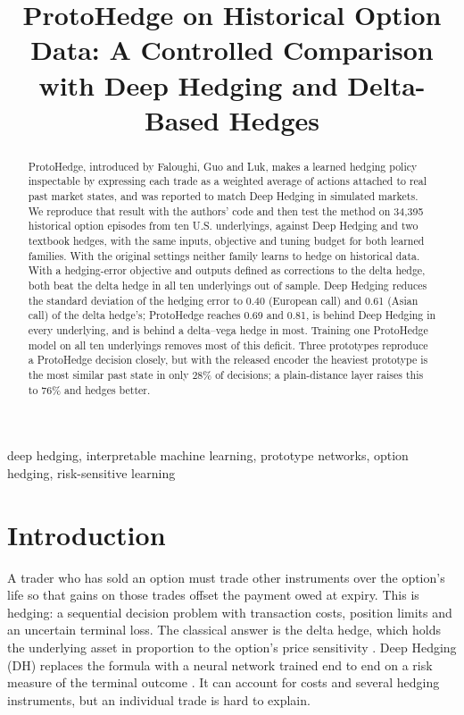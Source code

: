 \documentclass[10pt,conference]{IEEEtran}
\newcommand{\DeepH}{Deep Hedging}
\begin{document}
\title{ProtoHedge on Historical Option Data: A Controlled Comparison with Deep Hedging and Delta-Based Hedges}

\author{}

\maketitle

\begin{abstract}
ProtoHedge, introduced by Faloughi, Guo and Luk, makes a learned hedging
policy inspectable by expressing each trade as a weighted average of actions
attached to real past market states, and was reported to match Deep Hedging
in simulated markets. We reproduce that result with the authors' code and
then test the method on 34,395 historical option episodes from ten U.S.
underlyings, against Deep Hedging and two textbook hedges, with the same
inputs, objective and tuning budget for both learned families. With the
original settings neither family learns to hedge on historical data. With a
hedging-error objective and outputs defined as corrections to the delta
hedge, both beat the delta hedge in all ten underlyings out of sample. Deep
Hedging reduces the standard deviation of the hedging error to 0.40
(European call) and 0.61 (Asian call) of the delta hedge's; ProtoHedge
reaches 0.69 and 0.81, is behind Deep Hedging in every underlying, and is
behind a delta--vega hedge in most. Training one ProtoHedge model on all ten
underlyings removes most of this deficit. Three prototypes reproduce a
ProtoHedge decision closely, but with the released encoder the heaviest
prototype is the most similar past state in only 28\% of decisions; a
plain-distance layer raises this to 76\% and hedges better.
\end{abstract}

\begin{IEEEkeywords}
deep hedging, interpretable machine learning, prototype networks, option
hedging, risk-sensitive learning
\end{IEEEkeywords}

\section{Introduction}

A trader who has sold an option must trade other instruments over the option's
life so that gains on those trades offset the payment owed at expiry. This is
hedging: a sequential decision problem with transaction costs, position limits
and an uncertain terminal loss. The classical answer is the delta hedge, which
holds the underlying asset in proportion to the option's price sensitivity
\cite{black1973pricing}. \DeepH{} (DH) replaces the formula with a neural
network trained end to end on a risk measure of the terminal outcome
\cite{buehler2019deep}. It can account for costs and several hedging
instruments, but an individual trade is hard to explain.
\end{document}
